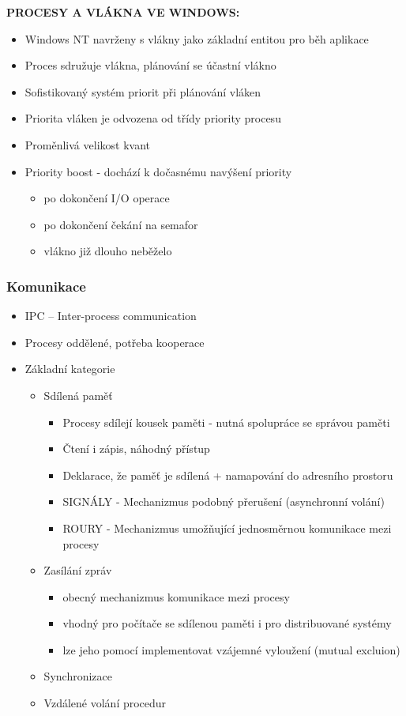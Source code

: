 \documentclass[10pt,a4paper]{article}
\begin{document}
\textbf{PROCESY A VLÁKNA VE WINDOWS:}
\begin{itemize}
	\item Windows NT navrženy s vlákny jako základní entitou pro běh aplikace
	\item Proces sdružuje vlákna, plánování se účastní vlákno
	\item Sofistikovaný systém priorit při plánování vláken
	\item Priorita vláken je odvozena od třídy priority procesu
	\item Proměnlivá velikost kvant
	\item Priority boost - dochází k dočasnému navýšení priority
	\begin{itemize}
		\item po dokončení I/O operace
		\item po dokončení čekání na semafor
		\item vlákno již dlouho neběželo
	\end{itemize}
\end{itemize}

\subsubsection{Komunikace}
\begin{itemize}
	\item IPC – Inter-process communication
	\item Procesy oddělené, potřeba kooperace
	\item Základní kategorie
	\begin{itemize}
		\item Sdílená paměť
		\begin{itemize}
			\item Procesy sdílejí kousek paměti - nutná spolupráce se správou paměti
			\item Čtení i zápis, náhodný přístup
			\item Deklarace, že paměť je sdílená + namapování do adresního prostoru
			\item SIGNÁLY - Mechanizmus podobný přerušení (asynchronní volání)
			\item ROURY - Mechanizmus umožňující jednosměrnou komunikace mezi procesy
		\end{itemize}
		\item Zasílání zpráv
		\begin{itemize}
			\item obecný mechanizmus komunikace mezi procesy
			\item vhodný pro počítače se sdílenou paměti i pro distribuované systémy
			\item lze jeho pomocí implementovat vzájemné vyloužení (mutual excluion)
		\end{itemize}
		\item Synchronizace
		\item Vzdálené volání procedur	
	\end{itemize}
\end{itemize}
\end{document}
